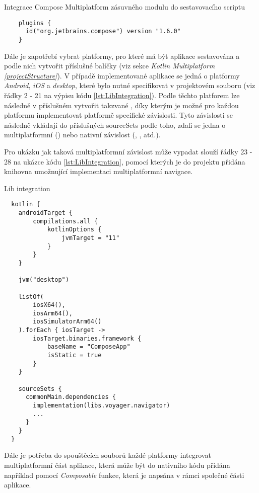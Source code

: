\begin{listing}[H]
\caption{Integrace Compose Multiplatform zásuvného modulu do sestavovacího scriptu}\label{lst:ComposePlugin}
\begin{verbatim}
    plugins {
      id("org.jetbrains.compose") version "1.6.0"
    }
\end{verbatim}
\end{listing}

Dále je zapotřebí vybrat platformy, pro které má být aplikace sestavována a podle nich vytvořit příslušné balíčky (viz sekce \textit{Kotlin Multiplatform \ref{projectStructure}}).
V případě implementované aplikace se jedná o platformy \textit{Android}, \textit{iOS} a \textit{desktop}, které bylo nutné specifikovat v projektovém 
souboru  (viz řádky 2 - 21 na výpisu kódu \ref{lst:LibIntegration}).
Podle těchto platforem lze následně v příslušném  vytvořit takzvané , díky kterým je možné
pro každou platformu implementovat platformě specifické závislosti. Tyto závislosti se následně vkládají do příslušných
sourceSets podle toho, zdali se jedna o multiplatformní () nebo nativní závislost (, , atd.).

Pro ukázku jak taková multiplatformní závislost může vypadat slouží řádky 23 - 28 na ukázce kódu \ref{lst:LibIntegration}, pomocí 
kterých je do projektu přidána knihovna umožnující implementaci multiplatformní navigace.

\begin{listing}[H]
\caption{Lib integration}\label{lst:LibIntegration}
\begin{verbatim}
  kotlin {
    androidTarget {
        compilations.all {
            kotlinOptions {
                jvmTarget = "11"
            }
        }
    }

    jvm("desktop")

    listOf(
        iosX64(),
        iosArm64(),
        iosSimulatorArm64()
    ).forEach { iosTarget ->
        iosTarget.binaries.framework {
            baseName = "ComposeApp"
            isStatic = true
        }
    }

    sourceSets {
      commonMain.dependencies {
        implementation(libs.voyager.navigator)
        ...
      }
    }
  }  
\end{verbatim}
\end{listing}

Dále je potřeba do spouštěcích souborů každé platformy integrovat multiplatformní část aplikace, která může být do nativního kódu přidána
například pomocí \textit{Composable} funkce, která je napsána v rámci společné části aplikace.

